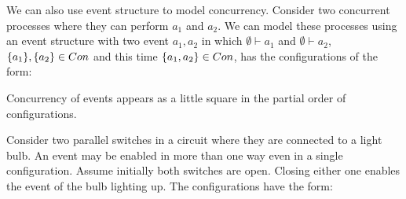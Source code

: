 \documentclass{article}
\begin{document}
\begin{example}
    We can also use event structure to model concurrency.
    Consider two concurrent processes where they can perform
    $a_1$ and $a_2$.
    We can model these processes using an event structure with
    two event $a_1,a_2$ in which $\emptyset \vdash a_1$ and $\emptyset \vdash a_2$,
    $\{a_1\},\{a_2\} \in Con$ and this time $\{a_1,a_2\} \in Con$,
    has the configurations of the form:
    \begin{center}
    \end{center}
    Concurrency of events appears as a little square in the partial order of configurations.
\end{example}

\begin{example}
    Consider two parallel switches in a circuit where they are connected
    to a light bulb.
    An event may be enabled in more than one way even in a single configuration.
    Assume initially both switches are open.
    Closing either one enables the event of the bulb lighting up.
    The configurations have the form:

    \begin{center}
    \end{center}
\end{example}
\end{document}
